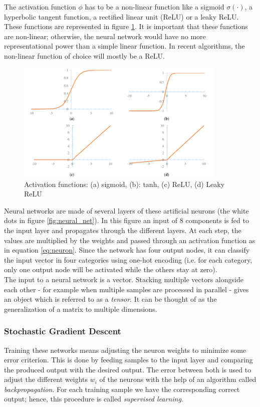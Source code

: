 The activation function $\phi$ has to be a non-linear function like a sigmoid $\sigma(\cdot)$, a hyperbolic tangent function, a rectified linear unit (ReLU) or a leaky ReLU. These functions are represented in figure \ref{fig:activation_funcs}. It is important that these functions are non-linear; otherwise, the neural network would have no more representational power than a simple linear function. In recent algorithms, the non-linear function of choice will mostly be a ReLU.

\begin{figure}[htp]
    \centering
    \includegraphics[width=10cm]{images/activation_funcs.png}
    \caption{Activation functions: (a) sigmoid, (b): tanh, (c) ReLU, (d) Leaky ReLU}
    \label{fig:activation_funcs}
\end{figure}

Neural networks \cite{nielsen2015neural} are made of several layers of these artificial neurons (the white dots in figure \ref{fig:neural_net}). In this figure an input of $8$ components is fed to the input layer and propagates through the different layers. At each step, the values are multiplied by the weights and passed through an activation function as in equation \ref{eq:neuron}. Since the network has four output nodes, it can classify the input vector in four categories using one-hot encoding (i.e. for each category, only one output node will be activated while the others stay at zero).\\
The input to a neural network is a vector. Stacking multiple vectors alongside each other - for example when multiple samples are processed in parallel - gives an object which is referred to as a \emph{tensor}. It can be thought of as the generalization of a matrix to multiple dimensions.
\subsubsection{Stochastic Gradient Descent}
Training these networks means adjusting the neuron weights to minimize some error criterion. This is done by feeding samples to the input layer and comparing the produced output with the desired output. The error between both is used to adjust the different weights $w_i$ of the neurons with the help of an algorithm called \emph{backpropagation}. For each training sample we have the corresponding correct output; hence, this procedure is called \emph{supervised learning}.\\

